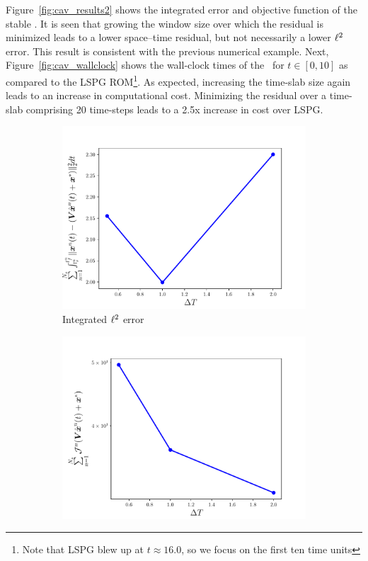 Figure~\ref{fig:cav_results2} shows the integrated error and objective function of the stable \methodAcronymROMs. It is seen that growing the window size over 
which the residual is minimized leads to a lower space--time residual, but not necessarily a lower $\ell^2$ error. This result is consistent with the previous numerical example. Next, Figure~\ref{fig:cav_wallclock}
shows the wall-clock times of the \methodAcronymROMs\ for $t \in [0,10]$ as compared to the LSPG ROM\footnote{Note that LSPG blew up at $t \approx 16.0$, so we focus on the first ten time units}. As expected, increasing the time-slab size again leads to an increase in computational cost. Minimizing the residual over a time-slab comprising 20 time-steps leads to a 2.5x increase in cost over LSPG. 


\begin{figure}
\begin{center}
\begin{subfigure}[t]{0.45\textwidth}
\includegraphics[trim={0cm 0cm 0cm 0cm},clip,width=1.\linewidth]{figs/cavity/error_vs_window_basis2.pdf}
\caption{Integrated $\ell^2$ error}
\label{fig:cav_results2a}
\end{subfigure}
\begin{subfigure}[t]{0.45\textwidth}
\includegraphics[trim={0cm 0cm 0cm 0cm},clip,width=1.\linewidth]{figs/cavity/objective_vs_window_basis2.pdf}

\end{subfigure}
\end{center}
\end{figure}

